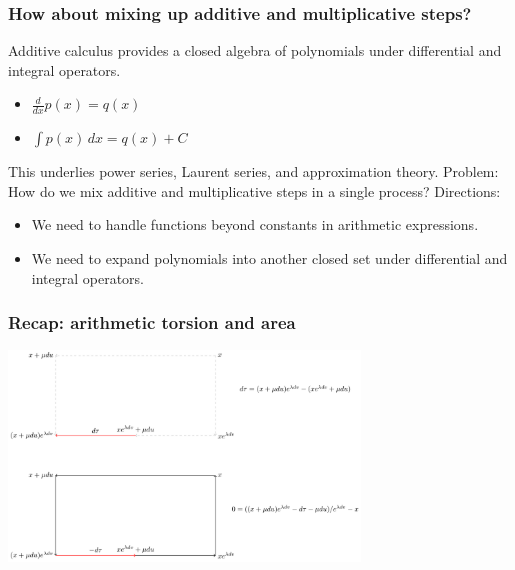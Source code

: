 \documentclass[aspectratio=169]{beamer}
\begin{document}
\begin{frame}
    \frametitle{How about mixing up additive and multiplicative steps?}
    Additive calculus provides a closed algebra of polynomials under differential and integral operators.
    \begin{itemize}
        \item $\frac{d}{dx} p(x) = q(x)$
        \item $\int p(x)\,dx = q(x) + C$
    \end{itemize}
    This underlies power series, Laurent series, and approximation theory.
    \newline\newline
    Problem: How do we mix additive and multiplicative steps in a single process?
    \newline\newline
    Directions:
    \begin{itemize}
        \item We need to handle functions beyond constants in arithmetic expressions.
        \item We need to expand polynomials into another closed set under differential and integral operators.
    \end{itemize}
\end{frame}

\begin{frame}
    \frametitle{Recap: arithmetic torsion and area}
    \begin{center}
        \includegraphics[width=0.7\textwidth]{../images/19-curl}
    \end{center}
\end{frame}
\end{document}
